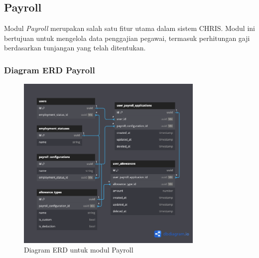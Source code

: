 



\subsection{Payroll}
Modul \textit{Payroll} merupakan salah satu fitur utama dalam sistem CHRIS\@. Modul ini bertujuan untuk mengelola data penggajian pegawai, termasuk perhitungan gaji berdasarkan tunjangan yang telah ditentukan.

\subsubsection{Diagram ERD Payroll}
\begin{figure}[H]
    \centering
    \includegraphics[width=0.8\textwidth]{assets/pics/fig_erd_payroll.png}
    \caption{Diagram ERD untuk modul Payroll}
    \label{fig:erd_payroll}
\end{figure}

